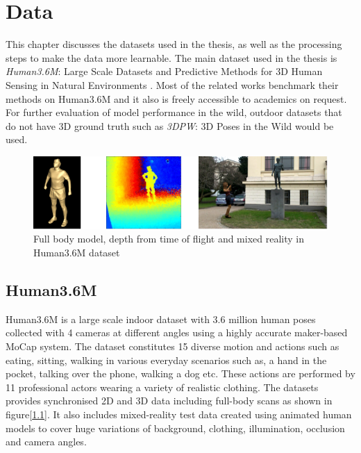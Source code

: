\chapter{Data}
\label{chap:data}
This chapter discusses the datasets used in the thesis, as well as the processing steps to make the data more learnable. The main dataset used in the thesis is \textit{Human3.6M}: Large Scale Datasets and Predictive Methods for 3D Human Sensing in Natural Environments \cite{H3.6}. Most of the related works benchmark their methods on Human3.6M and it also is freely accessible to academics on request. For further evaluation of model performance in the wild, outdoor datasets that do not have 3D ground truth such as \textit{3DPW}: 3D Poses in the Wild \cite{3dpw} would be used.

\begin{figure}[h]
    \centering
    \includegraphics[width=\textwidth]{figures/h36/modlities.png}
    \caption{Full body model, depth from time of flight and mixed reality in Human3.6M dataset}
    \label{fig:h36_modality}
\end{figure}

\section{Human3.6M}
Human3.6M is a large scale indoor dataset with 3.6 million human poses collected with 4 cameras at different angles using a highly accurate maker-based \ac{MoCap} system. The dataset constitutes 15 diverse motion and actions such as eating, sitting, walking in various everyday scenarios such as, a hand in the pocket, talking over the phone, walking a dog etc. These actions are performed by 11 professional actors wearing a variety of realistic clothing. The datasets provides synchronised 2D and 3D data including full-body scans as shown in figure[\ref{fig:h36_modality}]. It also includes mixed-reality test data created using animated human models to cover huge variations of background, clothing, illumination, occlusion and camera angles.

